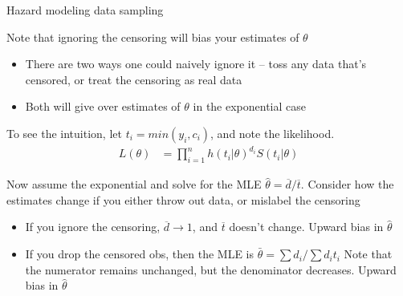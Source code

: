\documentclass[notes,11pt, aspectratio=169]{beamer}
\newenvironment{wideitemize}{\itemize\addtolength{\itemsep}{10pt}}{\enditemize}
\begin{document}
\begin{frame}{Hazard modeling data sampling}
  \begin{wideitemize}
  \item Note that ignoring the censoring will bias your estimates of $\theta$
    \begin{itemize}
    \item There are two ways one could naively ignore it -- toss any
      data that's censored, or treat the censoring as real data
    \item Both will give over estimates of $\theta$ in the exponential case
    \end{itemize}
  \item To see the intuition, let $t_{i} = min(y_{i}, c_{i})$, and
    note the likelihood.
      \begin{align*}
        L(\theta) &= \prod_{i=1}^{n} h(t_{i}|\theta)^{d_{i}} S(t_{i}|\theta)
      \end{align*}
    \item Now assume the exponential and solve for the MLE
      $\hat{\theta} = \overline{d}/\overline{t}$. Consider how
      the estimates change if you either throw out data, or mislabel
      the censoring
      \begin{itemize}
      \item If you ignore the censoring, $\overline{d} \rightarrow 1$,
        and $\overline{t}$ doesn't change. Upward bias in
        $\hat{\theta}$
      \item If you drop the censored obs, then the MLE is
        $\bar{\theta} = \sum d_{i} / \sum d_{i} t_{i}$ Note that the
        numerator remains unchanged, but the denominator
        decreases. Upward bias in $\hat{\theta}$
      \end{itemize}
  \end{wideitemize}
  \end{frame}
\end{document}
